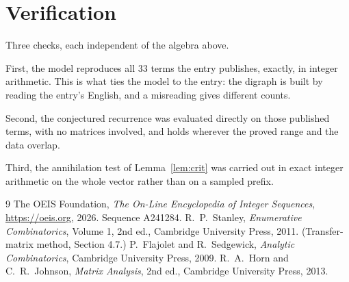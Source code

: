 \documentclass[11pt,a4paper]{article}
\theoremstyle{plain}
\theoremstyle{definition}
\begin{document}
\section{Verification}

Three checks, each independent of the algebra above.

First, the model reproduces all $33$ terms the entry publishes, exactly, in integer
arithmetic. This is what ties the model to the entry: the digraph is built by reading the
entry's English, and a misreading gives different counts.

Second, the conjectured recurrence was evaluated directly on those published terms, with no
matrices involved, and holds wherever the proved range and the data overlap.

Third, the annihilation test of Lemma~\ref{lem:crit} was carried out in exact integer
arithmetic on the whole vector rather than on a sampled prefix.

\begin{thebibliography}{9}
 The OEIS Foundation, \emph{The On-Line Encyclopedia of Integer
Sequences}, \url{https://oeis.org}, 2026. Sequence A241284.
 R.~P.~Stanley, \emph{Enumerative Combinatorics}, Volume 1, 2nd ed.,
Cambridge University Press, 2011. (Transfer-matrix method, Section 4.7.)
 P.~Flajolet and R.~Sedgewick, \emph{Analytic Combinatorics}, Cambridge
University Press, 2009.
 R.~A.~Horn and C.~R.~Johnson, \emph{Matrix Analysis}, 2nd ed., Cambridge
University Press, 2013.
\end{thebibliography}
\end{document}
